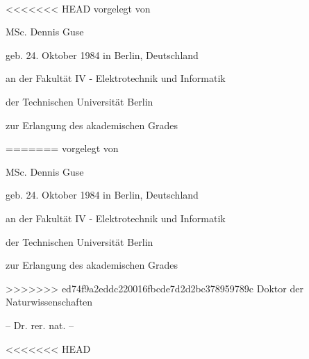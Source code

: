 \begin{titlepage}
    \begin{addmargin}[-1cm]{-3cm}
    \begin{center}
        \large  

        \hfill

        \vfill

        \begingroup
            \color{Maroon}\spacedallcaps{\myTitle} \\ \bigskip
        \endgroup

<<<<<<< HEAD
				\vspace{0.7cm}	
				vorgelegt von
				
				\vspace{0.7cm}	
				MSc. Dennis Guse
				
				geb. 24. Oktober 1984 in Berlin, Deutschland

				\vspace{1.7cm}
				an der Fakultät IV - Elektrotechnik und Informatik
				
				der Technischen Universität Berlin
				
				zur Erlangung des akademischen Grades

				\vspace{0.7cm}
=======
				vorgelegt von
				
				\vspace{0.5cm}	
				MSc. Dennis Guse
				
				geb. 24. Oktober 1984 in Berlin, Deutschland
				\vspace{1.5cm}				
				
				an der Fakultät IV - Elektrotechnik und Informatik
				
				der Technischen Universität Berlin
				
				zur Erlangung des akademischen Grades

				\vspace{0.5cm}
>>>>>>> ed74f9a2eddc220016fbcde7d2d2bc378959789c
				Doktor der Naturwissenschaften
				
				-- Dr. rer. nat. --

<<<<<<< HEAD
				\vspace{2.2cm}
				

\end{center}
\end{addmargin}
\end{titlepage}
